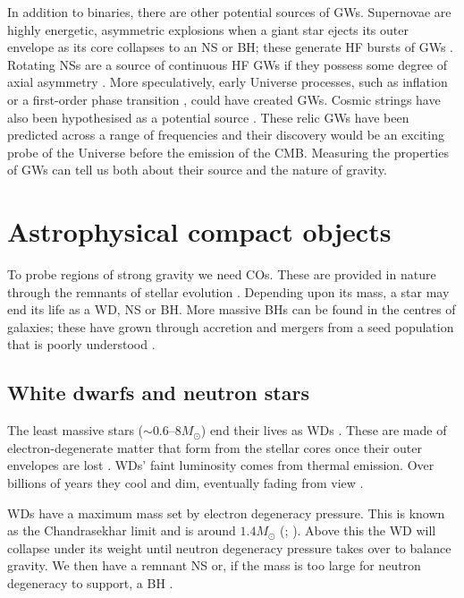 In addition to binaries, there are other potential sources of GWs. Supernovae are highly energetic, asymmetric explosions when a giant star ejects its outer envelope as its core collapses to an NS or BH; these generate HF bursts of GWs \citep{Dimmelmeier2002,Kotake2006}. Rotating NSs are a source of continuous HF GWs if they possess some degree of axial asymmetry \citep{Abbott2007,Prix2009}. More speculatively, early Universe processes, such as inflation \citep{Grishchuk2005} or a first-order phase transition \citep{Binetruy2012}, could have created GWs. Cosmic strings have also been hypothesised as a potential source \citep{Damour2005,Binetruy2012}. These relic GWs have been predicted across a range of frequencies and their discovery would be an exciting probe of the Universe before the emission of the CMB. Measuring the properties of GWs can tell us both about their source and the nature of gravity.

\section{Astrophysical compact objects}\label{sec:COs}

To probe regions of strong gravity we need COs. These are provided in nature through the remnants of stellar evolution \citep[section 1.1]{Shapiro1983}. Depending upon its mass, a star may end its life as a WD, NS or BH. More massive BHs can be found in the centres of galaxies; these have grown through accretion and mergers from a seed population that is poorly understood \citep{Volonteri2010}.

\subsection{White dwarfs and neutron stars}

The least massive stars ($\sim0.6$--$8M_\odot$) end their lives as WDs \citep{Poelarends2008}. These are made of electron-degenerate matter that form from the stellar cores once their outer envelopes are lost \citep{Althaus2010}. WDs' faint luminosity comes from thermal emission. Over billions of years they cool and dim, eventually fading from view \citep[section 4.2]{Shapiro1983}.

WDs have a maximum mass set by electron degeneracy pressure. This is known as the Chandrasekhar limit and is around $1.4 M_\odot$ (\citealt[section 3.4]{Shapiro1983}; \citealt{Nomoto1987,Timmes1996}). %
Above this the WD will collapse under its weight until neutron degeneracy pressure takes over to balance gravity. We then have a remnant NS or, if the mass is too large for neutron degeneracy to support, a BH \citep{Woosley2002,Langer2012}.

